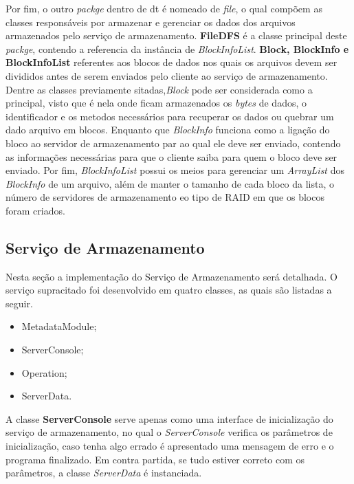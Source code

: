 Por fim, o outro \textit{packge} dentro de dt é nomeado de \textit{file}, o qual compõem as classes responsáveis por armazenar e gerenciar os dados dos arquivos armazenados pelo serviço de armazenamento. \textbf{FileDFS} é a classe principal deste \textit{packge}, contendo a referencia da instância de \textit{BlockInfoList}. \textbf{Block, BlockInfo e BlockInfoList} referentes aos blocos de dados nos quais os arquivos devem ser divididos antes de serem enviados pelo cliente ao serviço de armazenamento. Dentre as classes previamente sitadas,\textit{Block} pode ser considerada como a principal, visto que é nela onde ficam armazenados os \textit{bytes} de dados, o identificador e os metodos necessários para recuperar os dados ou quebrar um dado arquivo em blocos. Enquanto que \textit{BlockInfo} funciona como a ligação do bloco ao servidor de armazenamento par ao qual ele deve ser enviado, contendo as informações necessárias para que o cliente saiba para quem o bloco deve ser enviado. Por fim, \textit{BlockInfoList} possui os meios para gerenciar um \textit{ArrayList} dos \textit{BlockInfo} de um arquivo, além de manter o tamanho de cada bloco da lista, o número de servidores de armazenamento eo tipo de RAID em que os blocos foram criados.
\\

\subsection{Serviço de Armazenamento}
Nesta seção a implementação do Serviço de Armazenamento será detalhada. O serviço supracitado foi desenvolvido em quatro classes, as quais são listadas a seguir.
\\

\begin{itemize}
	\item MetadataModule;
	\item ServerConsole;
	\item Operation;
	\item ServerData.
\end{itemize}

A classe \textbf{ServerConsole} serve apenas como uma interface de inicialização do serviço de armazenamento, no qual o \textit{ServerConsole} verifica os parâmetros de inicialização, caso tenha algo errado é apresentado uma mensagem de erro e o programa finalizado. Em contra partida, se tudo estiver correto com os parâmetros, a classe \textit{ServerData} é instanciada.
\\

